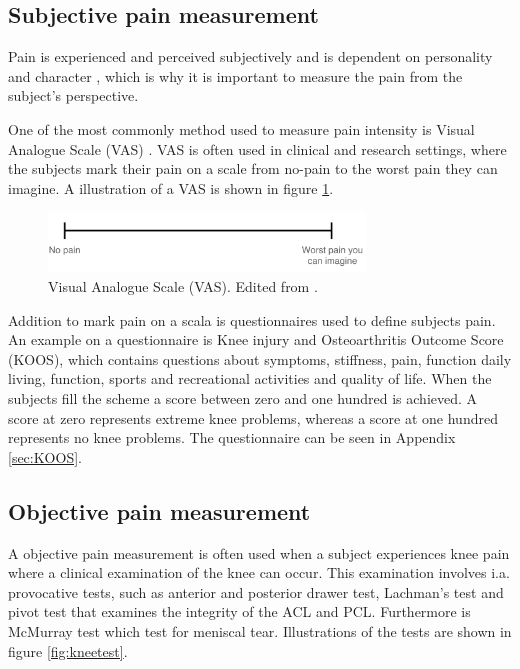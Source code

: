 \subsection{Subjective pain measurement}
Pain is experienced and perceived subjectively \citep{IASP2012, Younger2009} and is dependent on personality and character \citep{Schmidt2013}, which is why it is important to measure the pain from the subject’s perspective.
 
\noindent
One of the most commonly method used to measure pain intensity is Visual Analogue Scale (VAS) \citep{Valente2011}. VAS is often used in clinical and research settings, where the subjects mark their pain on a scale from no-pain to the worst pain they can imagine.\citep{Haefeli2005} A illustration of a VAS is shown in figure \ref{fig:VAS}.

\begin{figure} [H]
\centering
\includegraphics[width=0.75\textwidth]{figures/VAS}
\caption{Visual Analogue Scale (VAS). Edited from \citep{Haefeli2005}.}
\label{fig:VAS}
\end{figure}

\noindent
Addition to mark pain on a scala is questionnaires used to define subjects pain. An example on a questionnaire is Knee injury and Osteoarthritis Outcome Score (KOOS), which contains questions about symptoms, stiffness, pain, function daily living, function, sports and recreational activities and quality of life. When the subjects fill the scheme a score between zero and one hundred is achieved. A score at zero represents extreme knee problems, whereas a score at one hundred represents no knee problems.\citep{Roos2003} The questionnaire can be seen in Appendix \ref{sec:KOOS}. 

\subsection{Objective pain measurement}
A objective pain measurement is often used when a subject experiences knee pain where a clinical examination of the knee can occur. This examination involves i.a. provocative tests, such as anterior and posterior drawer test, Lachman’s test and pivot test that examines the integrity of the ACL and PCL. Furthermore is McMurray test which test for meniscal tear.\citep{Ghosh2010} Illustrations of the tests are shown in figure \ref{fig:kneetest}.

